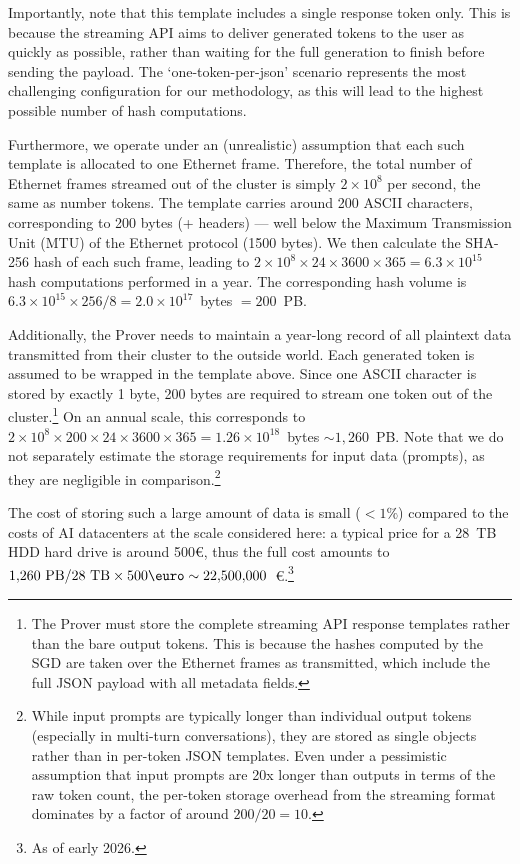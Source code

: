 \documentclass{article}
\begin{document}
Importantly, note that this template includes a single response token only. This is because the streaming API aims to deliver generated tokens to the user as quickly as possible, rather than waiting for the full generation to finish before sending the payload. The `one-token-per-json' scenario represents the most challenging configuration for our methodology, as this will lead to the highest possible number of hash computations.

Furthermore, we operate under an (unrealistic) assumption that each such template is allocated to one Ethernet frame. Therefore, the total number of Ethernet frames streamed out of the cluster is simply $2 \times 10^8$ per second, the same as number tokens. The template carries around 200 ASCII characters, corresponding to 200 bytes (+ headers) --- well below the Maximum Transmission Unit (MTU) of the Ethernet protocol (1500 bytes). We then calculate the SHA-256 hash of each such frame, leading to $2 \times 10^8 \times 24 \times 3600 \times 365 = 6.3 \times 10^{15}$ hash computations performed in a year. The corresponding hash volume is $6.3 \times 10^{15} \times 256 / 8 = 2.0 \times 10^{17}$~bytes $= 200$~PB.

Additionally, the Prover needs to maintain a year-long record of all plaintext data transmitted from their cluster to the outside world. Each generated token is assumed to be wrapped in the template above. Since one ASCII character is stored by exactly 1 byte, 200 bytes are required to stream one token out of the cluster.\footnote{The Prover must store the complete streaming API response templates rather than the bare output tokens. This is because the hashes computed by the SGD are taken over the Ethernet frames as transmitted, which include the full JSON payload with all metadata fields.} On an annual scale, this corresponds to $2 \times 10^8 \times 200 \times 24 \times 3600 \times 365 = 1.26 \times 10^{18}$~bytes $\sim 1{,}260$~PB. Note that we do not separately estimate the storage requirements for input data (prompts), as they are negligible in comparison.\footnote{While input prompts are typically longer than individual output tokens (especially in multi-turn conversations), they are stored as single objects rather than in per-token JSON templates. Even under a pessimistic assumption that input prompts are 20x longer than outputs in terms of the raw token count, the per-token storage overhead from the streaming format dominates by a factor of around $200/20 = 10$.}

The cost of storing such a large amount of data is small ($<1\%$) compared to the costs of AI datacenters at the scale considered here: a typical price for a 28~TB HDD hard drive is around 500\euro, thus the full cost amounts to $1{,}260~\text{PB}/28~\text{TB} \times 500\text{\euro} \sim 22{,}500{,}000$~\euro.\footnote{As of early 2026.}
\end{document}
